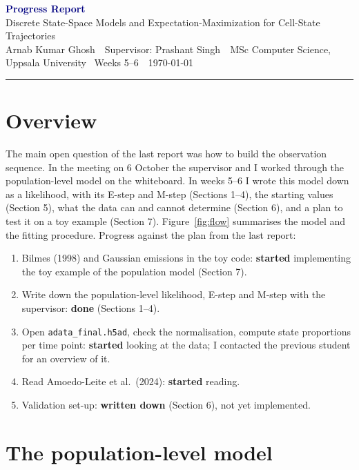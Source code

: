 \documentclass[10pt,a4paper]{article}
\newcommand{\myname}{Arnab Kumar Ghosh}
\newcommand{\reporttitle}{Progress Report}
\newcommand{\projecttitle}{Discrete State-Space Models and Expectation-Maximization for Cell-State Trajectories}
\newcommand{\supervisor}{Prashant Singh}
\newcommand{\period}{Weeks 5--6}
\newcommand{\reportdate}{\today}
\begin{document}
\begin{center}
  {\Large\bfseries\textcolor{navy}{\reporttitle}}\\[2pt]
  {\projecttitle}\\[3pt]
  {\small \myname\ \textperiodcentered\ Supervisor: \supervisor\ \textperiodcentered\ MSc Computer Science, Uppsala University \textperiodcentered\ \period\ \textperiodcentered\ \reportdate}
\end{center}
\vspace{-2pt}
\hrule
\vspace{4pt}

\section*{Overview}
The main open question of the last report was how to build the observation sequence. In the meeting on 6 October the supervisor and I worked through the population-level model on the whiteboard. In weeks 5--6 I wrote this model down as a likelihood, with its E-step and M-step (Sections 1--4), the starting values (Section 5), what the data can and cannot determine (Section 6), and a plan to test it on a toy example (Section 7). Figure~\ref{fig:flow} summarises the model and the fitting procedure. Progress against the plan from the last report:

\begin{enumerate}
  \item Bilmes (1998) and Gaussian emissions in the toy code: \textbf{started} implementing the toy example of the population model (Section 7).
  \item Write down the population-level likelihood, E-step and M-step with the supervisor: \textbf{done} (Sections 1--4).
  \item Open \texttt{adata\_final.h5ad}, check the normalisation, compute state proportions per time point: \textbf{started} looking at the data; I contacted the previous student for an overview of it.
  \item Read Amoedo-Leite et al.\ (2024): \textbf{started} reading.
  \item Validation set-up: \textbf{written down} (Section 6), not yet implemented.
\end{enumerate}

\section{The population-level model}
\end{document}
